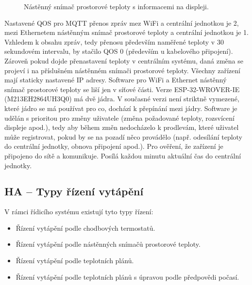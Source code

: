 \begin{figure}[H]
\caption{Nástěnný snímač prostorové teploty s informacemi na displeji.}
\label{fig:software-hanastenny-snimac-prostorove-teploty-zapnuty-displej}
\end{figure}

Nastavené QOS pro MQTT přenos zpráv mez WiFi a centrální jednotkou je 2, mezi Ethernetem nástěnným snímač prostorové teploty a centrální jednotkou je 1. Vzhledem k obsahu zpráv, tedy přenosu především naměřené teploty v 30 sekundovém intervalu, by stačilo QOS 0 (především u kabelového připojení). Zároveň pokud dojde přenastavení teploty v centrálním systému, daná změna se projeví i na příslušném nástěnném snímači prostorové teploty. Všechny zařízení mají staticky nastavené IP adresy. Software pro WiFi a Ethernet nástěnný snímač prostorové teploty se liší jen v síťové části. Verze ESP-32-WROVER-IE (M213EH2864UH3Q0) má dvě jádra. V současné verzi není striktně vymezené, které jádro se má používat pro co, dochází k přepínání mezi jádry. Software je udělán s prioritou pro změny uživatele (změna požadované teploty, rozsvícení displeje apod.), tedy aby během změn nedocházelo k prodlevám, které uživatel může registrovat, pokud by se na pozadí něco provádělo (např. odesílání teploty do centrální jednotky, obnova připojení apod.). Pro ověření, že zařízení je připojeno do sítě a komunikuje. Posílá každou minutu aktuální čas do centrální jednotky.


\newpage

\subsection{HA – Typy řízení vytápění}

\label{sec:typy-rizeni-vytapeni}
V rámci řídicího systému existují tyto typy řízení:

\begin{itemize}
  \item Řízení vytápění podle chodbových termostatů.
  \item Řízení vytápění podle nástěnných snímačů prostorové teploty.
  \item Řízení vytápění podle teplotních plánů.
  \item Řízení vytápění podle teplotních plánů s úpravou podle předpovědi počasí.
\end{itemize}

